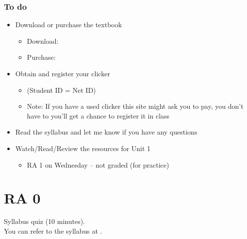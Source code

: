 \documentclass[11pt,containsverbatim,handout,xcolor=xelatex,dvipsnames,table]{beamer}
\begin{document}
\begin{frame}
\frametitle{To do}

\begin{itemize}

\item Download or purchase the textbook
\begin{itemize}
\item Download: 
\item Purchase: 
\end{itemize}

\item Obtain and register your clicker
\begin{itemize}
\item {} (Student ID = Net ID) 
\item Note: If you have a used clicker this site might ask you to pay, you don't have to
you'll get a chance to register it in class
\end{itemize}

\item Read the syllabus and let me know if you have any questions

\item Watch/Read/Review the resources for Unit 1
\begin{itemize}
\item RA 1 on Wednesday -- not graded (for practice)
\end{itemize}

\end{itemize}

\end{frame}


\section{RA 0}


\begin{frame}

\vfill

Syllabus quiz (10 minutes). \\

You can refer to the syllabus at \webURL{\CourseSite}.

\vfill

\end{frame}
\end{document}
